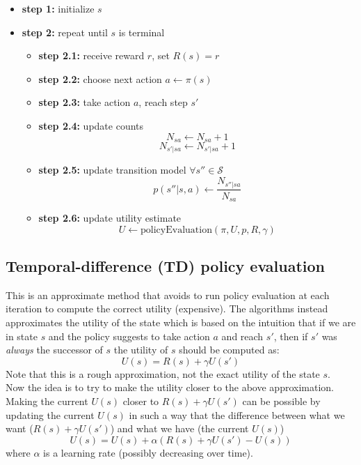 \begin{itemize}
	\item \textbf{step 1:} initialize $s$

	\item \textbf{step 2:} repeat until $s$ is terminal
		\begin{itemize}
			\item \textbf{step 2.1:} receive reward $r$, set $R(s) = r$

			\item \textbf{step 2.2:} choose next action $a \leftarrow \pi(s)$

			\item \textbf{step 2.3:} take action $a$, reach step $s'$

			\item \textbf{step 2.4:} update counts
				\[
					N_{sa}\leftarrow N_{sa}+1
				\]
				\[
					N_{s' | sa}\leftarrow N_{s' | sa}+1
				\]

			\item \textbf{step 2.5:} update transition model
				$\forall s'' \in \mathcal{S}$
				\[
					p(s'' | s,a) \leftarrow \frac{N_{s''|sa}}{N_{sa}}
				\]

			\item \textbf{step 2.6:} update utility estimate
				\[
					U \leftarrow \text{policyEvaluation}(\pi, U, p, R, \gamma)
				\]
		\end{itemize}
\end{itemize}

\subsection{Temporal-difference (TD) policy evaluation}
This is an approximate method that avoids to run policy evaluation at each iteration
to compute the correct utility (expensive). The algorithms instead approximates
the utility of the state which is based on the intuition that if we are in state
$s$ and the policy suggests to take action $a$ and reach $s'$, then if $s'$ was \textit{always}
the successor of $s$ the utility of $s$ should be computed as:
\begin{equation}
	U(s) = R(s) + \gamma U(s')
\end{equation}
Note that this is a rough approximation, not the exact utility of the state $s$.\\
Now the idea is to try to make the utility closer to the above approximation. Making
the current $U(s)$ closer to $R(s)+ \gamma U(s')$ can be possible by updating the
current $U(s)$ in such a way that the difference between what we want ($R(s)+ \gamma
U(s')$) and what we have (the current $U(s)$)
\begin{equation}
	U(s) = U(s) + \alpha(R(s) + \gamma U(s') - U(s))
\end{equation}
where $\alpha$ is a learning rate (possibly decreasing over time).
\newline

